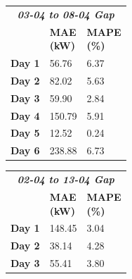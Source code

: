 \begin{table}[H]
	\begin{minipage}[t]{.45\textwidth}
		\begin{center}
			\begin{tabular}[t]{l|l|l}
				\multicolumn{3}{c}{\textbf{\textit{03-04 to 08-04 Gap}}} \\
				               &
				\makecell{\textbf{MAE}                                   \\\textbf{(kW)}} &
				\makecell{\textbf{MAPE}                                  \\\textbf{(\%)}} \\
				\hline
				\textbf{Day 1} & 56.76  & 6.37                           \\
				\textbf{Day 2} & 82.02  & 5.63                           \\
				\textbf{Day 3} & 59.90  & 2.84                           \\
				\textbf{Day 4} & 150.79 & 5.91                           \\
				\textbf{Day 5} & 12.52  & 0.24                           \\
				\textbf{Day 6} & 238.88 & 6.73
			\end{tabular}
		\end{center}
	\end{minipage}%
	\hfill
	\begin{minipage}[t]{.45\textwidth}
		\begin{center}
			\begin{tabular}[t]{l|l|l}
				\multicolumn{3}{c}{\textbf{\textit{02-04 to 13-04 Gap}}} \\
				                &
				\makecell{\textbf{MAE}                                   \\\textbf{(kW)}} &
				\makecell{\textbf{MAPE}                                  \\\textbf{(\%)}} \\
				\hline
				\textbf{Day 1}  & 148.45 & 3.04                          \\
				\textbf{Day 2}  & 38.14  & 4.28                          \\
				\textbf{Day 3}  & 55.41  & 3.80                          \\

\end{tabular}
\end{center}
\end{minipage}
\end{table}

